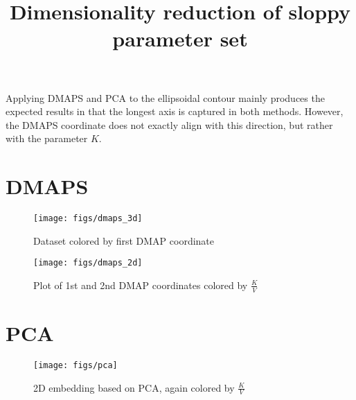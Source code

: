 \documentclass[11pt]{article}
\title{Dimensionality reduction of sloppy parameter set}
\begin{document}
\maketitle

Applying DMAPS and PCA to the ellipsoidal contour mainly produces the expected results in that the longest axis is captured in both methods. However, the DMAPS coordinate does not exactly align with this direction, but rather with the parameter $K$.

\section{DMAPS}

\begin{figure}[ht]
  \centering
  \texttt{[image: figs/dmaps\_3d]}
  \caption{Dataset colored by first DMAP coordinate}
\end{figure}

\begin{figure}[ht]
  \centering
  \texttt{[image: figs/dmaps\_2d]}
  \caption{Plot of 1st and 2nd DMAP coordinates colored by $\frac{K}{V}$}
\end{figure}

\clearpage

\section{PCA}

\begin{figure}[ht]
  \centering
  \texttt{[image: figs/pca]}
  \caption{2D embedding based on PCA, again colored by $\frac{K}{V}$}
\end{figure}


% 
% 
\end{document}
